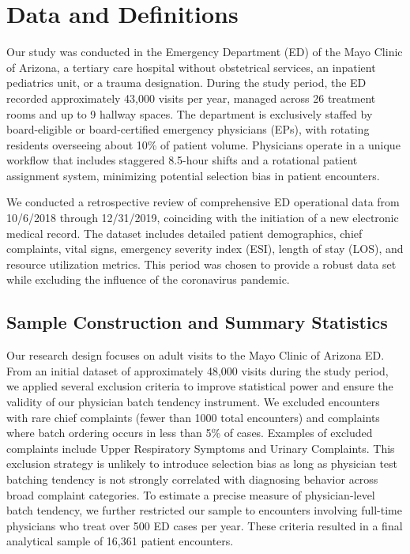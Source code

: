 \documentclass{article}
\begin{document}
\hypertarget{sec:II}{%
\section{Data and Definitions}\label{sec:II}}

Our study was conducted in the Emergency Department (ED) of the Mayo
Clinic of Arizona, a tertiary care hospital without obstetrical
services, an inpatient pediatrics unit, or a trauma designation. During
the study period, the ED recorded approximately 43,000 visits per year,
managed across 26 treatment rooms and up to 9 hallway spaces. The
department is exclusively staffed by board-eligible or board-certified
emergency physicians (EPs), with rotating residents overseeing about
10\% of patient volume. Physicians operate in a unique workflow that
includes staggered 8.5-hour shifts and a rotational patient assignment
system, minimizing potential selection bias in patient encounters.

We conducted a retrospective review of comprehensive ED operational data
from 10/6/2018 through 12/31/2019, coinciding with the initiation of a
new electronic medical record. The dataset includes detailed patient
demographics, chief complaints, vital signs, emergency severity index
(ESI), length of stay (LOS), and resource utilization metrics. This
period was chosen to provide a robust data set while excluding the
influence of the coronavirus pandemic.

\hypertarget{sample-construction-and-summary-statistics}{%
\subsection{Sample Construction and Summary
Statistics}\label{sample-construction-and-summary-statistics}}

Our research design focuses on adult visits to the Mayo Clinic of
Arizona ED. From an initial dataset of approximately 48,000 visits
during the study period, we applied several exclusion criteria to
improve statistical power and ensure the validity of our physician batch
tendency instrument. We excluded encounters with rare chief complaints
(fewer than 1000 total encounters) and complaints where batch ordering
occurs in less than 5\% of cases. Examples of excluded complaints
include Upper Respiratory Symptoms and Urinary Complaints. This
exclusion strategy is unlikely to introduce selection bias as long as
physician test batching tendency is not strongly correlated with
diagnosing behavior across broad complaint categories. To estimate a
precise measure of physician-level batch tendency, we further restricted
our sample to encounters involving full-time physicians who treat over
500 ED cases per year. These criteria resulted in a final analytical
sample of 16,361 patient encounters.
\end{document}
